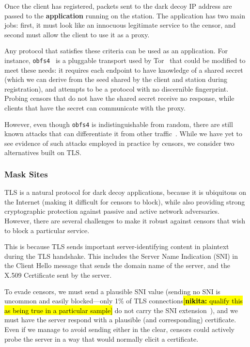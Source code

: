\documentclass[letterpaper,twocolumn,10pt]{article}
\newcommand{\note}[2]{\hl{[\textbf{#1:} #2]}\xspace}
\newcommand{\nikita}[1]{\note{nikita}{#1}}
\begin{document}
Once the client has registered, packets sent to the dark decoy IP address are
passed to the \textbf{application} running on the station. The application has
two main jobs: first, it must look like an innocuous legitimate service to the
censor, and second must allow the client to use it as a proxy.

Any protocol that satisfies these criteria can be used as an application. For
instance, \texttt{obfs4}~\cite{obfs4} is a pluggable transport used by
Tor~\cite{tor} that could be
modified to meet these needs: it requires each endpoint to have knowledge of a
shared secret (which we can derive from the seed shared by the client and
station during registration), and attempts to be a protocol with no discernible
fingerprint. Probing censors that do not have the shared secret receive no
response, while clients that have the secret can communicate with the proxy.

However, even though \texttt{obfs4} is indistinguishable from random, there are
still known attacks that can differentiate it from other
traffic~\cite{wang2015seeing}. While we have yet to see evidence of such attacks
employed in practice by censors, we consider two alternatives built on TLS.


\FigOverview

\subsubsection{Mask Sites}

TLS is a natural protocol for dark decoy applications, because it is ubiquitous on
the Internet (making it difficult for censors to block), while also providing
strong cryptographic protection against passive and active network adversaries.
However, there are several challenges to make it robust against censors that
wish to block a particular service.

This is because TLS sends important server-identifying content in plaintext
during the TLS handshake. This includes the Server Name Indication (SNI) in the
Client Hello message that sends the domain name of the server, and the
X.509 Certificate sent by the server.

To evade censors, we must send a plausible SNI value (sending no SNI is
uncommon and easily blocked---only 1\% of TLS connections\nikita{qualify this as being true in a particular sample} do not carry the
SNI extension~\cite{tls-fingerprint}), and we must have the server respond with
a plausible (and corresponding) certificate. Even if we manage to avoid sending
either in the clear, censors could actively probe the server in a
way that would normally elicit a certificate.
\end{document}

